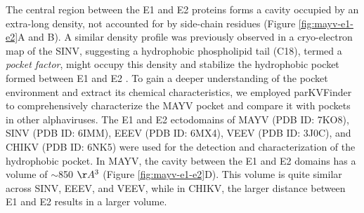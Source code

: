 \documentclass[Ingles]{phdthesis}
\begin{document}
The central region between the E1 and E2 proteins forms a cavity occupied by an extra-long density, not accounted for by side-chain residues (Figure \ref{fig:mayv-e1-e2}A and B). A similar density profile was previously observed in a cryo-electron map of the \ac{SINV}, suggesting a hydrophobic phospholipid tail (C18), termed a \textit{pocket factor}, might occupy this density and stabilize the hydrophobic pocket formed between E1 and E2 \cite{chen2018}. To gain a deeper understanding of the pocket environment and extract its chemical characteristics, we employed parKVFinder \cite{guerra2020} to comprehensively characterize the \acs{MAYV} pocket and compare it with pockets in other alphaviruses. The E1 and E2 ectodomains of \acs{MAYV} (PDB ID: 7KO8), \acs{SINV} (PDB ID: 6IMM), \ac{EEEV} (PDB ID: 6MX4), \ac{VEEV} (PDB ID: 3J0C), and \ac{CHIKV} (PDB ID: 6NK5) were used for the detection and characterization of the hydrophobic pocket. In \acs{MAYV}, the cavity between the E1 and E2 domains has a volume of $\sim$850 $\AA^3$ (Figure \ref{fig:mayv-e1-e2}D). This volume is quite similar across \acs{SINV}, \acs{EEEV}, and \acs{VEEV}, while in \acs{CHIKV}, the larger distance between E1 and E2 results in a larger volume.
\end{document}
